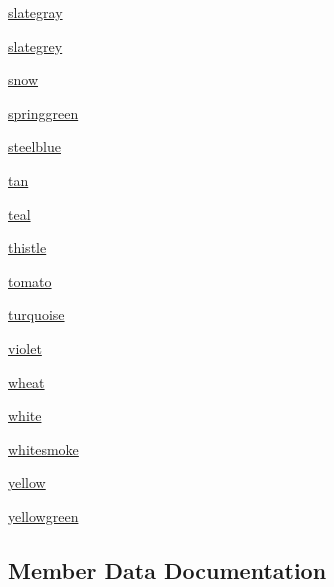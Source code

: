 \begin{DoxyCompactItemize}
\item 
\hyperlink{enumbridges_1_1base_1_1_named_color_a4e79b495b764239831be4f2ace1a727f}{slategray}
\item 
\hyperlink{enumbridges_1_1base_1_1_named_color_a43e40e1c3db71ae925eb8bc37c95a762}{slategrey}
\item 
\hyperlink{enumbridges_1_1base_1_1_named_color_a92ea18875f5defb08e57cc25e61c1df9}{snow}
\item 
\hyperlink{enumbridges_1_1base_1_1_named_color_a7a143a590a72dda8864959e149f5056e}{springgreen}
\item 
\hyperlink{enumbridges_1_1base_1_1_named_color_a7b837b6b35a4cefaccc859c775210971}{steelblue}
\item 
\hyperlink{enumbridges_1_1base_1_1_named_color_ac5ede4192a18ae31ae5ddbbe54f1538b}{tan}
\item 
\hyperlink{enumbridges_1_1base_1_1_named_color_af1b8b9f5b7a4d15a6a610a549f3345a6}{teal}
\item 
\hyperlink{enumbridges_1_1base_1_1_named_color_abc79560d8cf2c7968ad2e9ca0cea6768}{thistle}
\item 
\hyperlink{enumbridges_1_1base_1_1_named_color_a6d6509379946c9dec4e1af978f800994}{tomato}
\item 
\hyperlink{enumbridges_1_1base_1_1_named_color_ac08ba3f77217db505c58bdd323320f62}{turquoise}
\item 
\hyperlink{enumbridges_1_1base_1_1_named_color_aff54fe2bb0b054f29e9f0a9636d299db}{violet}
\item 
\hyperlink{enumbridges_1_1base_1_1_named_color_a93b3cebe6b9ade8be7d4464deeda0247}{wheat}
\item 
\hyperlink{enumbridges_1_1base_1_1_named_color_a1020b159cfe64b5df1c19f1734b5ed34}{white}
\item 
\hyperlink{enumbridges_1_1base_1_1_named_color_aec573e4f20721fb6660fade7a4fcdae7}{whitesmoke}
\item 
\hyperlink{enumbridges_1_1base_1_1_named_color_aaecc9a80f5e566148c7d448424532d95}{yellow}
\item 
\hyperlink{enumbridges_1_1base_1_1_named_color_a263dc51f00db00ef12d4f24cc2c6ee5c}{yellowgreen}
\end{DoxyCompactItemize}


\subsection{Member Data Documentation}
\mbox{\label{enumbridges_1_1base_1_1_named_color_a8d2d3904e6e7f1f6a144365d6fae6b92}} 
